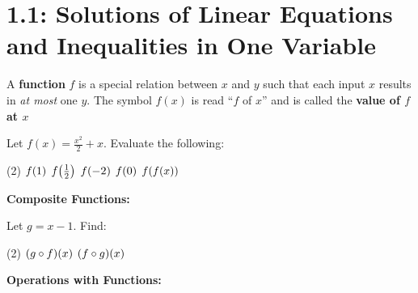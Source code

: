 \documentclass[../mathNotesPreamble]{subfiles}
\begin{document}
  \section{1.1: Solutions of Linear Equations and Inequalities in One Variable}
  \begin{defn*}
    A \textbf{function} $f$ is a special relation between $x$ and $y$ such that each input $x$ results in \emph{at most} one $y$. The symbol $f(x)$ is read ``$f$ of $x$'' and is called the \textbf{value of $f$ at $x$}
  \end{defn*}
  \vspace*{0\baselineskip}
  \begin{ex*}
    Let $f(x)=\frac{x^2}{2}+x$. Evaluate the following:
    \begin{extasks}[after-item-skip=\stretch{1}](2)
      \task $f{\left(1\right)}$
      \task $f{\left(\frac{1}{2}\right)}$
      \task $f{\left(-2\right)}$
      \task $f{\left(0\right)}$
      \task $f{\left(f(x)\right)}$
    \end{extasks}
  \end{ex*}

  \noindent\textbf{Composite Functions:}

  \noindent{}
  \begin{ex*}
    Let $g=x-1$. Find:
    \begin{extasks}[after-item-skip=\stretch{1}](2)
      \task ${\left(g\circ f\right)}(x)$
      \task ${\left(f\circ g\right)}(x)$
    \end{extasks}
  \end{ex*}
  
  \pagebreak
  \noindent\textbf{Operations with Functions:}

  \noindent{}
\end{document}
